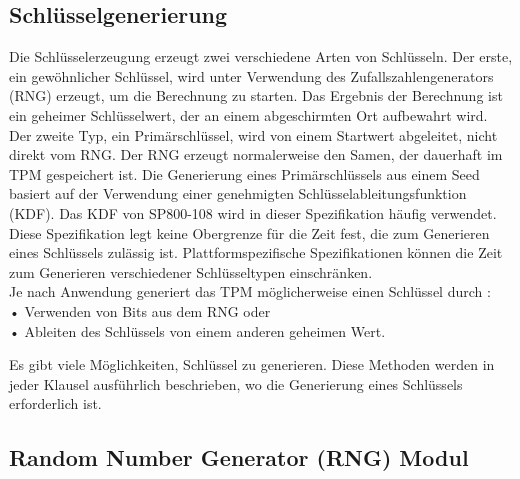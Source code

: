 \subsection{Schlüsselgenerierung}
Die Schlüsselerzeugung erzeugt zwei verschiedene Arten von Schlüsseln. Der erste, ein gewöhnlicher Schlüssel, wird unter Verwendung des Zufallszahlengenerators (RNG) erzeugt, um die Berechnung zu starten. Das Ergebnis der Berechnung ist ein geheimer Schlüsselwert, der an einem abgeschirmten Ort aufbewahrt wird.
\\
Der zweite Typ, ein Primärschlüssel, wird von einem Startwert abgeleitet, nicht direkt vom RNG. Der RNG erzeugt normalerweise den Samen, der dauerhaft im TPM gespeichert ist. Die Generierung eines Primärschlüssels aus einem Seed basiert auf der Verwendung einer genehmigten Schlüsselableitungsfunktion (KDF). Das KDF von SP800-108 wird in dieser Spezifikation häufig verwendet.
\\
Diese Spezifikation legt keine Obergrenze für die Zeit fest, die zum Generieren eines Schlüssels zulässig ist. Plattformspezifische Spezifikationen können die Zeit zum Generieren verschiedener Schlüsseltypen einschränken.
\\
Je nach Anwendung generiert das TPM möglicherweise einen Schlüssel durch :
\\
• Verwenden von Bits aus dem RNG oder \\
• Ableiten des Schlüssels von einem anderen geheimen Wert.


Es gibt viele Möglichkeiten, Schlüssel zu generieren. Diese Methoden werden in jeder Klausel ausführlich beschrieben, wo die Generierung eines Schlüssels erforderlich ist.

\subsection{Random Number Generator (RNG) Modul}
